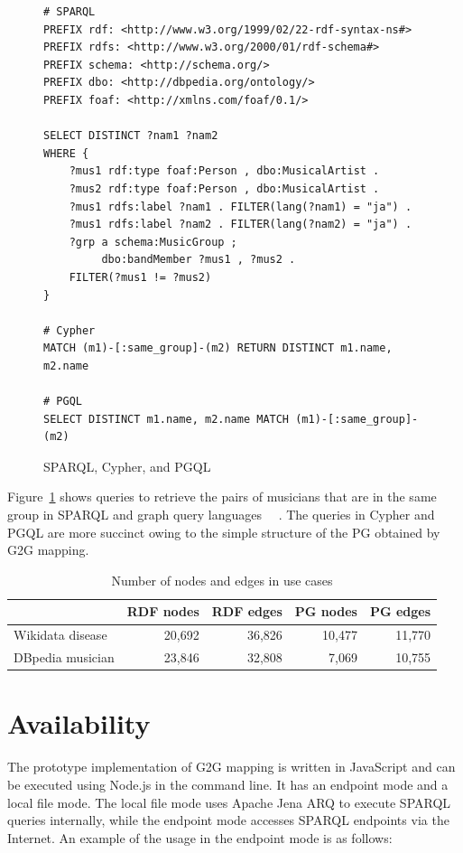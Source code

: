 \documentclass[runningheads]{llncs}
\begin{document}
\begin{figure}[!t]
\vspace{2mm}
\begin{scriptsize}
\begin{verbatim}
# SPARQL
PREFIX rdf: <http://www.w3.org/1999/02/22-rdf-syntax-ns#>
PREFIX rdfs: <http://www.w3.org/2000/01/rdf-schema#>
PREFIX schema: <http://schema.org/>
PREFIX dbo: <http://dbpedia.org/ontology/>
PREFIX foaf: <http://xmlns.com/foaf/0.1/>
 
SELECT DISTINCT ?nam1 ?nam2
WHERE {
    ?mus1 rdf:type foaf:Person , dbo:MusicalArtist .
    ?mus2 rdf:type foaf:Person , dbo:MusicalArtist .
    ?mus1 rdfs:label ?nam1 . FILTER(lang(?nam1) = "ja") .
    ?mus1 rdfs:label ?nam2 . FILTER(lang(?nam2) = "ja") .
    ?grp a schema:MusicGroup ;
         dbo:bandMember ?mus1 , ?mus2 .
    FILTER(?mus1 != ?mus2)
}

# Cypher
MATCH (m1)-[:same_group]-(m2) RETURN DISTINCT m1.name, m2.name

# PGQL
SELECT DISTINCT m1.name, m2.name MATCH (m1)-[:same_group]-(m2)
\end{verbatim}
\end{scriptsize}
\caption{SPARQL, Cypher, and PGQL}
\label{fig:sparql}
\end{figure}
 
Figure~\ref{fig:sparql} shows queries to retrieve the pairs of musicians that are in the same group in SPARQL and graph query languages ~\cite{openCypher}~\cite{pgql}. The queries in Cypher and PGQL are more succinct owing to the simple structure of the PG obtained by G2G mapping.

\begin{table}[h]
    \centering
    \begin{tabular}{l|r|r|r|r}
        \hline
        & RDF nodes & RDF edges & PG nodes & PG edges \\
        \hline
        Wikidata disease & 20,692 & 36,826 & 10,477 & 11,770 \\
        DBpedia musician & 23,846 & 32,808 & 7,069 & 10,755 \\
        \hline
    \end{tabular}
    \caption{Number of nodes and edges in use cases}
    \label{table:numbers}
\end{table}


\section{Availability}
The prototype implementation of G2G mapping is written in JavaScript and can be executed using Node.js in the command line. It has an endpoint mode and a local file mode. The local file mode uses Apache Jena ARQ to execute SPARQL queries internally, while the endpoint mode accesses SPARQL endpoints via the Internet. An example of the usage in the endpoint mode is as follows:
\end{document}
